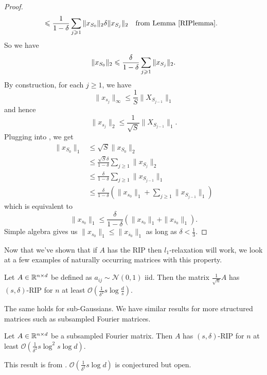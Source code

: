 \documentclass[11pt]{article}
\begin{document}
\begin{proof}
\begin{align*}
                &\le \frac{1}{1 - \delta}\sum\limits_{j \ge 1}\|x_{S_0}\|_2 \delta \|x_{S_j}\|_2 && \text{from Lemma~\ref{RIPlemma}}.
\end{align*}
So we have
\begin{align}
\|x_{S_0}\|_2 \le \frac{\delta}{1 - \delta}\sum\limits_{j \ge 1}\|x_{S_j}\|_2.\equationlabel{l2norm}
\end{align}
By construction, for each $j \ge 1$, we have
\[
\|x_{s_j}\|_\infty \le \frac{1}{S}\|X_{S_{j-1}}\|_1
\]
and hence
\[
\|x_{s_j}\|_2 \le \frac{1}{\sqrt{S}}\|X_{S_{j-1}}\|_1.
\]
Plugging into , we get
\begin{align*}
\|x_{S_0}\|_1 &\le \sqrt{S}\|x_{S_0}\|_2\\
              &\le \frac{\sqrt{S}\delta}{1 - \delta}\sum\limits_{j \ge 1}\|x_{S_j}\|_2\\
              &\le \frac{\delta}{1 - \delta}\sum\limits_{j \ge 1}\|x_{S_{j-1}}\|_1\\
              &\le \frac{\delta}{1 - \delta}(\|x_{s_0}\|_1 + \sum\limits_{j \ge 1}\|x_{S_{j-1}}\|_1)
\end{align*}
which is equivalent to
\[
\|x_{s_0}\|_1 \le \frac{\delta}{1 - \delta}(\|x_{s_0}\|_1 + \|x_{\overline{s}_0}\|_1).
\]
Simple algebra gives us $\|x_{s_0}\|_1 \le \|x_{\overline{s}_0}\|_1$ as long as $\delta < \frac{1}{3}$.
\end{proof}
Now that we've shown that if $A$ has the RIP then $l_1$-relaxation will work, we look at a few examples of naturally occurring matrices with this property.
\begin{theorem}
Let $A \in \R^{n \times d}$ be defined as $a_{ij} \sim \mathcal{N}(0,1)$ iid. Then the matrix $\frac{1}{\sqrt{n}}A$ has $(s, \delta)$-RIP for $n$ at least $\mathcal{O}\left(\frac{1}{\delta^2}s \log{\frac{d}{s}}\right)$.
\end{theorem}
The same holds for sub-Gaussians. We have similar results for more structured matrices such as subsampled Fourier matrices.
\begin{theorem}
Let $A \in \R^{n \times d}$ be a subsampled Fourier matrix. Then $A$ has $(s, \delta)$-RIP for $n$ at least $\mathcal{O}\left(\frac{1}{\delta^2}s \log^2 s\log d\right)$.
\end{theorem}
This result is from \cite{DBLP:journals/corr/HavivR15a}. $\mathcal{O}\left(\frac{1}{\delta^2}s\log d\right)$ is conjectured but open.
\end{document}
